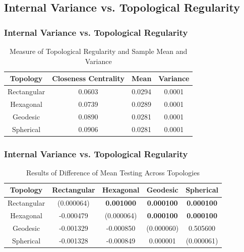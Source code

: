 \documentclass[nototal,handout]{beamer}
\begin{document}
\subsection{Internal Variance vs. Topological Regularity} 

\begin{frame}
	\frametitle{Internal Variance vs. Topological Regularity}
  \begin{table}
  \centering
  \begin{minipage}{\textwidth}
  \caption{Measure of Topological Regularity and Sample Mean and Variance}
  \label{vardeg}
  \begin{tabular}{|c||c|c|c|}
  \hline
  Topology & Closeness Centrality & Mean & Variance\\
  \hline
  Rectangular & 0.0603 & 0.0294 &0.0001\\
  Hexagonal & 0.0739 & 0.0289 &0.0001\\
  Geodesic & 0.0890 & 0.0281 &0.0001\\
  Spherical & 0.0906 & 0.0281 &0.0001\\
  \hline
  \end{tabular}
  \end{minipage}
  \end{table}
 \end{frame} 

\begin{frame}
	\frametitle{Internal Variance vs. Topological Regularity}
  \begin{table}
    \begin{minipage}{\textwidth}
    \caption{Results of Difference of Mean Testing Across Topologies}
    \label{rlt:all}
    \begin{tabular}{|c||c|c|c|c|}
    \hline
    \textbf{Topology}&Rectangular		&Hexagonal &Geodesic &Spherical\\\hline
    \hline
 	Rectangular & (0.000064) & \textbf{0.001000} & \textbf{0.000100} & \textbf{0.000100}\\\hline
 	Hexagonal & -0.000479 & (0.000064) & \textbf{0.000100} & \textbf{0.000100}\\\hline
 	Geodesic & -0.001329 & -0.000850 & (0.000060) & 0.505600\\\hline
 	Spherical & -0.001328 & -0.000849 & 0.000001 & (0.000061)\\\hline
 
    \end{tabular}
    \end{minipage}
  \end{table}
 \end{frame} 
\end{document}
